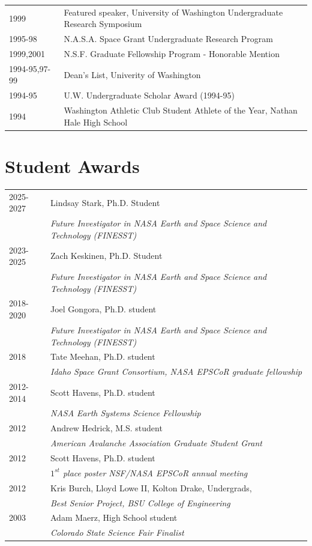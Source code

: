 \documentclass[11pt]{article}
\begin{document}
\begin{tabular}{ll}
1999 & Featured speaker, University of Washington Undergraduate Research Symposium \\
1995-98 & N.A.S.A. Space Grant Undergraduate Research Program \\
1999,2001 & N.S.F. Graduate Fellowship Program - Honorable Mention \\
1994-95,97-99 & Dean's List, Univerity of Washington \\
1994-95 & U.W. Undergraduate Scholar Award (1994-95) \\
1994 & Washington Athletic Club Student Athlete of the Year, Nathan Hale High School \\
\end{tabular}

\section*{Student Awards}
\begin{tabular}{ll}
2025-2027 & Lindsay Stark, Ph.D. Student \\
& \textit{Future Investigator in NASA Earth and Space Science and Technology (FINESST)} \\
2023-2025 & Zach Keskinen, Ph.D. Student \\ 
& \textit{Future Investigator in NASA Earth and Space Science and Technology (FINESST)} \\
2018-2020 & Joel Gongora, Ph.D. student \\
& \textit{Future Investigator in NASA Earth and Space Science and Technology (FINESST)} \\
2018 & Tate Meehan, Ph.D. student \\
& \textit{Idaho Space Grant Consortium, NASA EPSCoR graduate fellowship} \\
2012-2014 & Scott Havens, Ph.D. student \\
& \textit{NASA Earth Systems Science Fellowship} \\
2012 & Andrew Hedrick, M.S. student \\
& \textit{American Avalanche Association Graduate Student Grant} \\
2012 & Scott Havens, Ph.D. student \\
& \textit{$1^{st}$ place poster NSF/NASA EPSCoR annual meeting} \\
2012 & Kris Burch, Lloyd Lowe II, Kolton Drake, Undergrads, \\ 
& \textit{Best Senior Project, BSU College of Engineering} \\
2003 & Adam Maerz, High School student \\
& \textit{Colorado State Science Fair Finalist}
\end{tabular}
\end{document}
